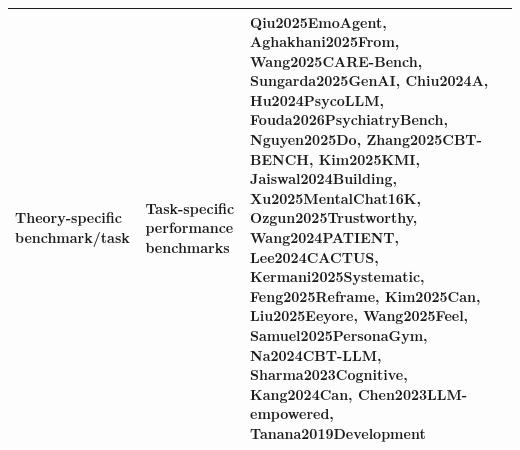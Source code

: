\begin{table}[htbp]
\begin{tabular}{p{3.5cm}p{4.2cm}p{6.4cm}}
Theory-specific benchmark/task & Task-specific performance benchmarks & Qiu2025EmoAgent, Aghakhani2025From, Wang2025CARE-Bench, Sungarda2025GenAI, Chiu2024A, Hu2024PsycoLLM, Fouda2026PsychiatryBench, Nguyen2025Do, Zhang2025CBT-BENCH, Kim2025KMI, Jaiswal2024Building, Xu2025MentalChat16K, Ozgun2025Trustworthy, Wang2024PATIENT, Lee2024CACTUS, Kermani2025Systematic, Feng2025Reframe, Kim2025Can, Liu2025Eeyore, Wang2025Feel, Samuel2025PersonaGym, Na2024CBT-LLM, Sharma2023Cognitive, Kang2024Can, Chen2023LLM-empowered, Tanana2019Development \\
\bottomrule
\end{tabular}
\end{table}

